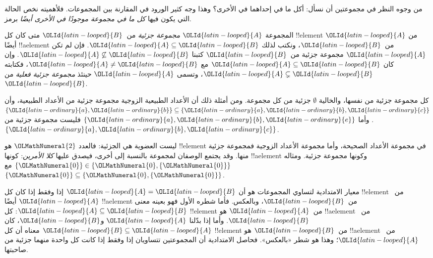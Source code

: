 \documentclass[../../../include/open-logic-section]{subfiles}
\begin{document}

\begin{explain}
من وجوه النظر في مجموعتين أن نسأل: أكل ما في إحداهما في الأخرى؟
وهذا وجه كثير الورود في المقارنة بين المجموعات. فلأهميته نخص الحالة
التي يكون فيها \emph{كل ما في مجموعة موجودًا في الأخرى أيضًا} برمز.
\end{explain}

\begin{defn}
المجموعة $\OLId{latin-looped}{A}$ \emph{مجموعة جزئية} من~$\OLId{latin-looped}{B}$ متى كان كل !!{element} من $\OLId{latin-looped}{A}$
أيضًا !!a{element} من~$\OLId{latin-looped}{B}$، ونكتب لذلك $\OLId{latin-looped}{A} \subseteq \OLId{latin-looped}{B}$.
فإن لم تكن $\OLId{latin-looped}{A}$ مجموعة جزئية من~$\OLId{latin-looped}{B}$ كتبنا $\OLId{latin-looped}{A} \not\subseteq \OLId{latin-looped}{B}$.
وإن كان $\OLId{latin-looped}{A} \subseteq \OLId{latin-looped}{B}$ مع $\OLId{latin-looped}{A} \neq \OLId{latin-looped}{B}$، فكتابته $\OLId{latin-looped}{A} \subsetneq \OLId{latin-looped}{B}$،
وتسمى $\OLId{latin-looped}{A}$ حينئذ \emph{مجموعة جزئية فعلية} من $\OLId{latin-looped}{B}$.
\end{defn}

\begin{ex}
كل مجموعة جزئية من نفسها، والخالية $\emptyset$ جزئية من كل مجموعة.
ومن أمثلة ذلك أن الأعداد الطبيعية الزوجية مجموعة جزئية من الأعداد
الطبيعية، وأن $\{ \OLId{latin-ordinary}{a}, \OLId{latin-ordinary}{b} \} \subseteq \{ \OLId{latin-ordinary}{a}, \OLId{latin-ordinary}{b}, \OLId{latin-ordinary}{c} \}$.
وأما $\{ \OLId{latin-ordinary}{a}, \OLId{latin-ordinary}{b}, \OLId{latin-ordinary}{e}
\}$ فليست مجموعة جزئية من $\{ \OLId{latin-ordinary}{a}, \OLId{latin-ordinary}{b}, \OLId{latin-ordinary}{c} \}$.
\end{ex}

\begin{ex}
ليست العضوية هي الجزئية: فالعدد $\OLMathNumeral{2}$ هو !!{element} في مجموعة الأعداد
الصحيحة، وأما مجموعة الأعداد الزوجية فمجموعة جزئية منها. وقد يجتمع
الوصفان لمجموعة بالنسبة إلى أخرى، فيصدق عليها \emph{كلا الأمرين}: كونها
!!a{element} وكونها مجموعة جزئية. ومثاله $\{\OLMathNumeral{0}\} \in \{\OLMathNumeral{0}, \{\OLMathNumeral{0}\}\}$ مع $\{\OLMathNumeral{0}\} \subseteq \{\OLMathNumeral{0},
\{\OLMathNumeral{0}\}\}$.
\end{ex}

معيار الامتدادية لتساوي المجموعات هو أن $\OLId{latin-looped}{A} = \OLId{latin-looped}{B}$ إذا وفقط إذا كان
كل !!{element} من~$\OLId{latin-looped}{A}$ أيضًا !!a{element} من~$\OLId{latin-looped}{B}$، وبالعكس.
فأما شطره الأول فهو بعينه معنى $\OLId{latin-looped}{A} \subseteq \OLId{latin-looped}{B}$: كل !!{element}
من~$\OLId{latin-looped}{A}$ هو !!a{element} من~$\OLId{latin-looped}{B}$. وأما إذا بدّلنا $\OLId{latin-looped}{A}$ و$\OLId{latin-looped}{B}$، كان
$\OLId{latin-looped}{B} \subseteq \OLId{latin-looped}{A}$ معناه أن كل !!{element} من~$\OLId{latin-looped}{B}$ هو !!a{element}
من~$\OLId{latin-looped}{A}$؛ وهذا هو شطر «بالعكس». فحاصل الامتدادية أن المجموعتين تتساويان
إذا وفقط إذا كانت كل واحدة منهما جزئية من صاحبتها.
\end{document}
